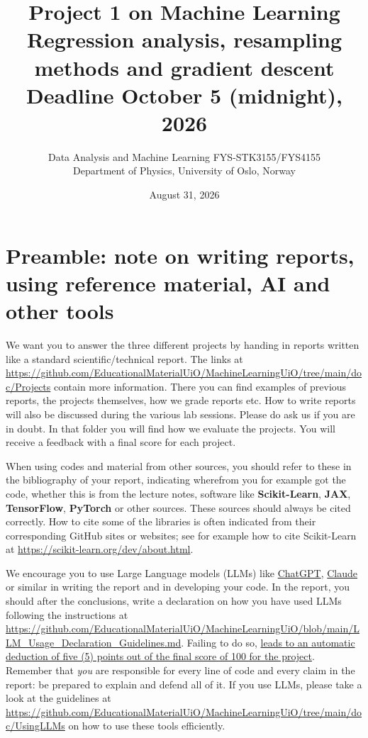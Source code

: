 \documentclass[11pt,a4paper]{article}
\title{Project 1 on Machine Learning\\[4pt]
  \large Regression analysis, resampling methods and gradient descent\\[4pt]
  \normalsize Deadline October 5 (midnight), 2026}
\author{Data Analysis and Machine Learning FYS-STK3155/FYS4155\\
  Department of Physics, University of Oslo, Norway}
\date{August 31, 2026}
\begin{document}
\maketitle

\section*{Preamble: note on writing reports, using reference material, AI and other tools}

We want you to answer the three different projects by handing in
reports written like a standard scientific/technical report.  The links at
\url{https://github.com/EducationalMaterialUiO/MachineLearningUiO/tree/main/doc/Projects}
contain more information.  There you can find examples of previous reports,
the projects themselves, how we grade reports etc.  How to write reports will
also be discussed during the various lab sessions.  Please do ask us if you
are in doubt. In that folder you will find how we evaluate the projects. You will receive a feedback with a final score for each project.

When using codes and material from other sources, you should refer to these
in the bibliography of your report, indicating wherefrom you for example got
the code, whether this is from the lecture notes, software like
\textbf{Scikit-Learn}, \textbf{JAX}, \textbf{TensorFlow}, \textbf{PyTorch} or other
sources.  These sources should always be cited correctly.  How to cite some of
the libraries is often indicated from their corresponding GitHub sites or
websites; see for example how to cite Scikit-Learn at
\url{https://scikit-learn.org/dev/about.html}.



We encourage you to use Large Language models (LLMs)  like \href{https://openai.com/chatgpt/}{ChatGPT},
\href{https://claude.ai}{Claude} or similar in writing the report and in
developing your code.
In the report, you should after the conclusions, write a declaration on how you have used LLMs following the instructions at \url{https://github.com/EducationalMaterialUiO/MachineLearningUiO/blob/main/LLM_Usage_Declaration_Guidelines.md}. Failing to do so, \uline{leads to an automatic deduction of five (5) points out of the final score of 100 for the  project}.
Remember that \emph{you} are responsible for every
line of code and every claim in the report: be prepared to explain and defend
all of it.
If you use LLMs, please take a look at the guidelines at \url{https://github.com/EducationalMaterialUiO/MachineLearningUiO/tree/main/doc/UsingLLMs} on how to use these tools efficiently. 
\end{document}
